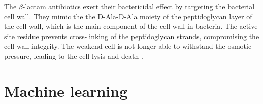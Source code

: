 The $\beta$-lactam antibiotics exert their bactericidal effect by targeting the bacterial cell wall. They mimic the the D-Ala-D-Ala moiety of the peptidoglycan layer of the cell wall, which is the main component of the cell wall in bacteria. The active site residue prevents cross-linking of the peptidoglycan strands, compromising the cell wall integrity. The weakend cell is not longer able to withstand the osmotic pressure, leading to the cell lysis and death \cite{kim2023}.


\section{Machine learning}

